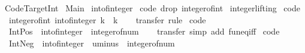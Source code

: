 %
\begin{isabellebody}%
%
%
\isamarkuptrue%
%
\isadelimtheory
%
\endisadelimtheory
%
\isatagtheory
{}\isamarkupfalse%
\ Code{\isacharunderscore}Target{\isacharunderscore}Int\isanewline
{}\ Main\isanewline
{}%
\endisatagtheory
{\isafoldtheory}%
%
\isadelimtheory
%
\endisadelimtheory
\isanewline
\isanewline
{}\isamarkupfalse%
\ int{\isacharunderscore}of{\isacharunderscore}integer\isanewline
\isanewline
{}\isamarkupfalse%
\ {\isacharbrackleft}{\isacharbrackleft}code\ drop{\isacharcolon}\ integer{\isacharunderscore}of{\isacharunderscore}int{\isacharbrackright}{\isacharbrackright}\isanewline
\isanewline
{}\isamarkupfalse%
\isanewline
{}\ integer{\isachardot}lifting\isanewline
{}\isanewline
\isanewline
{}\isamarkupfalse%
\ {\isacharbrackleft}code{\isacharbrackright}{\isacharcolon}\isanewline
\ \ {\isachardoublequoteopen}integer{\isacharunderscore}of{\isacharunderscore}int\ {\isacharparenleft}int{\isacharunderscore}of{\isacharunderscore}integer\ k{\isacharparenright}\ {\isacharequal}\ k{\isachardoublequoteclose}\isanewline
%
\isadelimproof
\ \ %
\endisadelimproof
%
\isatagproof
{}\isamarkupfalse%
\ transfer\ rule%
\endisatagproof
{\isafoldproof}%
%
\isadelimproof
\isanewline
%
\endisadelimproof
\isanewline
{}\isamarkupfalse%
\ {\isacharbrackleft}code{\isacharbrackright}{\isacharcolon}\isanewline
\ \ {\isachardoublequoteopen}Int{\isachardot}Pos\ {\isacharequal}\ int{\isacharunderscore}of{\isacharunderscore}integer\ {\isasymcirc}\ integer{\isacharunderscore}of{\isacharunderscore}num{\isachardoublequoteclose}\isanewline
%
\isadelimproof
\ \ %
\endisadelimproof
%
\isatagproof
{}\isamarkupfalse%
\ transfer\ {\isacharparenleft}simp\ add{\isacharcolon}\ fun{\isacharunderscore}eq{\isacharunderscore}iff{\isacharparenright}%
\endisatagproof
{\isafoldproof}%
%
\isadelimproof
\isanewline
%
\endisadelimproof
\isanewline
{}\isamarkupfalse%
\ {\isacharbrackleft}code{\isacharbrackright}{\isacharcolon}\isanewline
\ \ {\isachardoublequoteopen}Int{\isachardot}Neg\ {\isacharequal}\ int{\isacharunderscore}of{\isacharunderscore}integer\ {\isasymcirc}\ uminus\ {\isasymcirc}\ integer{\isacharunderscore}of{\isacharunderscore}num{\isachardoublequoteclose}\isanewline

\end{isabellebody}
